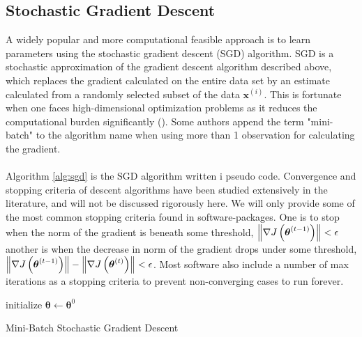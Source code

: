 \subsection{Stochastic Gradient Descent} \label{sec:sgd}
A widely popular and more computational feasible approach is to learn parameters using the stochastic gradient descent (SGD) algorithm. SGD is a stochastic approximation of the gradient descent algorithm described above, which replaces the gradient calculated on the entire data set by an estimate calculated from a randomly selected subset of the data $\boldsymbol{x}^{(i)}$. This is fortunate when one faces high-dimensional optimization problems as it reduces the computational burden significantly (\cite{bottou2008tradeoffs}). Some authors append the term "mini-batch" to the algorithm name when using more than 1 observation for calculating the gradient.\\
\\
Algorithm \ref{alg:sgd} is the SGD algorithm written i pseudo code. Convergence and stopping criteria of descent algorithms have been studied extensively in the literature, and will not be discussed rigorously here. We will only provide some of the  most common stopping criteria found in software-packages. One is to stop when the norm of the gradient is beneath some threshold, $\left\lVert\nabla J \left (\boldsymbol{\theta}^{(t-1)}\right)\right\rVert < \epsilon$ another is when the decrease in norm of the gradient drops under some threshold, $\left\lVert\nabla J \left (\boldsymbol{\theta}^{(t -1 )}\right)\right\rVert - \left\lVert \nabla J \left (\boldsymbol{\theta}^{(t)}\right)\right\rVert < \epsilon$. Most software also include a number of max iterations as a stopping criteria to prevent non-converging cases to run forever.\\
\begin{algorithm} \label{alg:sgd}
    \SetAlgoLined
    initialize $\boldsymbol{\theta}\leftarrow \boldsymbol{\theta}^0$ \\
     \caption{Mini-Batch Stochastic Gradient Descent}
\end{algorithm}

